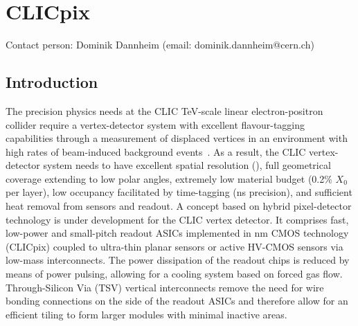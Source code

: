 \section{CLICpix}
Contact person: Dominik Dannheim (email: dominik.dannheim@cern.ch)

\subsection{Introduction}
 The precision physics needs at the CLIC TeV-scale linear electron-positron collider
require a vertex-detector system with excellent flavour-tagging capabilities through
a measurement of displaced vertices in an environment with high rates
of beam-induced background events~\cite{Miyamoto:1425915}.
As a result, the CLIC vertex-detector system needs to have excellent spatial resolution
(\unit[3]{\micron}),
full geometrical coverage extending to low polar angles, extremely low material budget
(0.2\% $X_0$ per layer),
low occupancy facilitated by time-tagging (\unit[10]{ns} precision), and sufficient heat
removal from sensors and readout.
A concept based on hybrid pixel-detector technology is under development
for the CLIC vertex detector. It comprises fast, low-power and small-pitch readout
ASICs implemented in \unit[65]{nm} CMOS technology (CLICpix) coupled to ultra-thin planar sensors
or active HV-CMOS sensors via low-mass interconnects. The power dissipation of the
readout chips is reduced by means of power pulsing, allowing for a cooling system
based on forced gas flow. Through-Silicon Via (TSV) vertical interconnects remove the need for wire
bonding connections on the side of the readout ASICs
and therefore allow for an efficient tiling to form larger modules with minimal
inactive areas.
